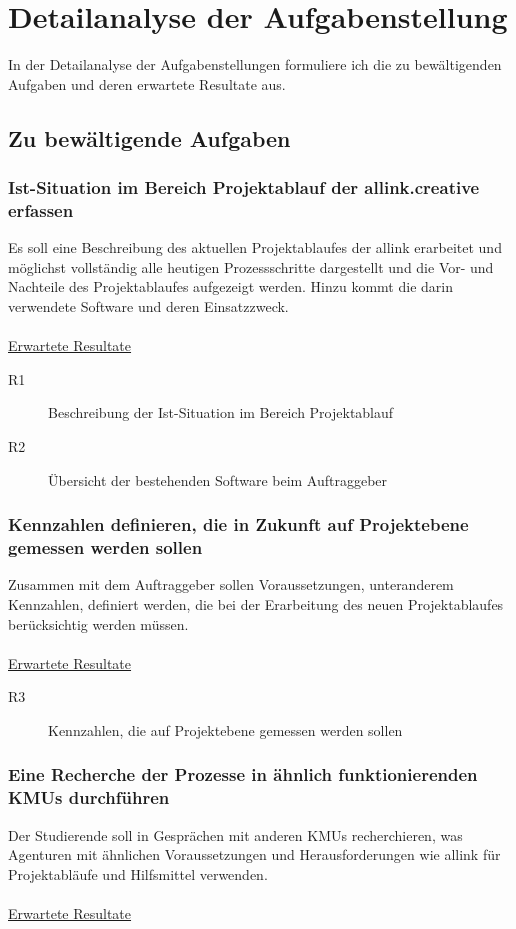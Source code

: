 \section{Detailanalyse der Aufgabenstellung}
In der Detailanalyse der Aufgabenstellungen formuliere ich die zu bewältigenden
Aufgaben und deren erwartete Resultate aus.

\subsection{Zu bewältigende Aufgaben}
\subsubsection{Ist-Situation im Bereich Projektablauf der allink.creative erfassen}
Es soll eine Beschreibung des aktuellen Projektablaufes der allink erarbeitet
und möglichst vollständig alle heutigen Prozessschritte dargestellt und die Vor- 
und Nachteile des Projektablaufes aufgezeigt werden. Hinzu kommt die darin verwendete Software und
deren Einsatzzweck.
\\\\
\underline{Erwartete Resultate}

\begin{description}
    \item[R1] Beschreibung der Ist-Situation im Bereich Projektablauf
    \item[R2] Übersicht der bestehenden Software beim Auftraggeber
\end{description}

\subsubsection{Kennzahlen definieren, die in Zukunft auf Projektebene gemessen werden sollen}
Zusammen mit dem Auftraggeber sollen Voraussetzungen, unteranderem Kennzahlen,
definiert werden, die bei der Erarbeitung des neuen Projektablaufes berücksichtig
werden müssen. 
\\\\
\underline{Erwartete Resultate}

\begin{description}
    \item[R3] Kennzahlen, die auf Projektebene gemessen werden sollen
\end{description}
  
\subsubsection{Eine Recherche der Prozesse in ähnlich funktionierenden KMUs durchführen}
Der Studierende soll in Gesprächen mit anderen KMUs recherchieren, was Agenturen
mit ähnlichen Voraussetzungen und Herausforderungen wie allink für Projektabläufe
und Hilfsmittel verwenden.
\\\\
\underline{Erwartete Resultate}

